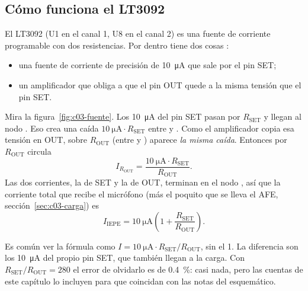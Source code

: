 \subsection{Cómo funciona el LT3092}

El LT3092 (U1 en el canal 1, U8 en el canal 2) es una fuente de corriente programable con dos resistencias. Por dentro
tiene dos cosas :
\begin{itemize}
  \item una fuente de corriente de precisión de \SI{10}{\micro\ampere} que sale por el pin \textsf{SET};
  \item un amplificador que obliga a que el pin \textsf{OUT} quede a la misma tensión que el pin \textsf{SET}.
\end{itemize}

Mira la figura~\ref{fig:c03-fuente}. Los \SI{10}{\micro\ampere} del pin SET pasan por $R_{\mathrm{SET}}$ y llegan al
nodo . Eso crea una caída $\SI{10}{\micro\ampere}\cdot R_{\mathrm{SET}}$ entre  y .
Como el amplificador copia esa tensión en OUT, sobre $R_{\mathrm{OUT}}$ (entre  y ) aparece
\emph{la misma caída}. Entonces por $R_{\mathrm{OUT}}$ circula
\begin{equation*}
  I_{R_{\mathrm{OUT}}} = \frac{\SI{10}{\micro\ampere}\cdot R_{\mathrm{SET}}}{R_{\mathrm{OUT}}}.
\end{equation*}
Las dos corrientes, la de SET y la de OUT, terminan en el nodo , así que la corriente total que recibe el
micrófono (más el poquito que se lleva el AFE, sección~\ref{sec:c03-carga}) es
\begin{equation}
  I_{\mathrm{IEPE}} = \SI{10}{\micro\ampere}\left(1 + \frac{R_{\mathrm{SET}}}{R_{\mathrm{OUT}}}\right).
  \label{eq:c03-lt3092}
\end{equation}

\begin{ojo}[el «+1» de la fórmula]
Es común ver la fórmula como $I = \SI{10}{\micro\ampere}\cdot R_{\mathrm{SET}}/R_{\mathrm{OUT}}$, sin el 1. La
diferencia son los \SI{10}{\micro\ampere} del propio pin SET, que también llegan a la carga. Con
$R_{\mathrm{SET}}/R_{\mathrm{OUT}} = 280$ el error de olvidarlo es de \SI{0.4}{\percent}: casi nada, pero las cuentas
de este capítulo lo incluyen para que coincidan con las notas del esquemático.
\end{ojo}

